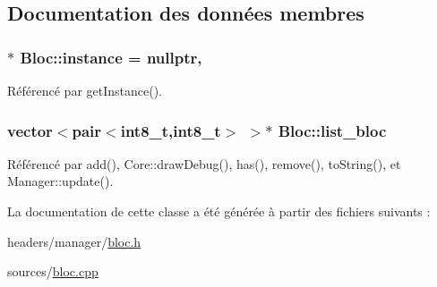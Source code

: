 \subsection{Documentation des données membres}
\hypertarget{classBloc_a39298425a48bcca70e70464f51193507}{
\subsubsection[{instance}]{ $\ast$ Bloc\-::instance = nullptr\hspace{0.3cm}{\ttfamily [static]}, {\ttfamily [private]}}}\label{classBloc_a39298425a48bcca70e70464f51193507}


Référencé par get\-Instance().

\hypertarget{classBloc_a51ad89062b91675830e0285f992f3210}{
\subsubsection[{list\-\_\-bloc}]{\setlength{\rightskip}{0pt plus 5cm}vector$<$pair$<$int8\-\_\-t,int8\-\_\-t$>$ $>$$\ast$ Bloc\-::list\-\_\-bloc}}\label{classBloc_a51ad89062b91675830e0285f992f3210}


Référencé par add(), Core\-::draw\-Debug(), has(), remove(), to\-String(), et Manager\-::update().



La documentation de cette classe a été générée à partir des fichiers suivants \-:\begin{DoxyCompactItemize}
\item 
headers/manager/\hyperlink{bloc_8h}{bloc.\-h}\item 
sources/\hyperlink{bloc_8cpp}{bloc.\-cpp}\end{DoxyCompactItemize}
